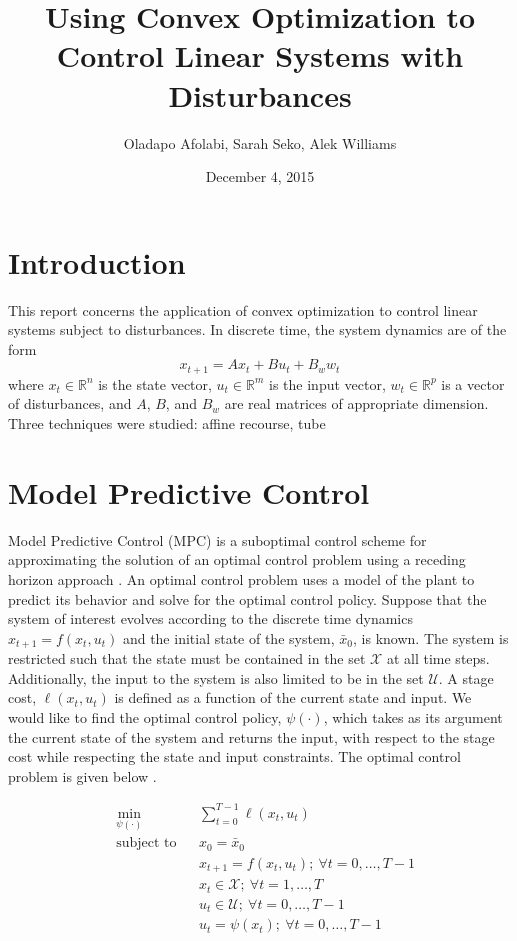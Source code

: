 \documentclass[12 pt]{report}
\title{Using Convex Optimization to Control Linear Systems with Disturbances}
\author{Oladapo Afolabi, Sarah Seko, Alek Williams}
\date{December 4, 2015}
\begin{document}
\maketitle

\begin{abstract}
\end{abstract}

\section{Introduction}
This report concerns the application of convex optimization to control linear systems subject to disturbances. In discrete time, the system dynamics are of the form $$ x_{t+1} = Ax_t + Bu_t + B_w w_t $$ where $x_t \in \mathbb{R}^n$ is the state vector, $u_t \in \mathbb{R}^m$ is the input vector, $w_t \in \mathbb{R}^p$ is a vector of disturbances, and $A$, $B$, and $B_w$ are real matrices of appropriate dimension. Three techniques were studied: affine recourse, tube 

\section{Model Predictive Control}

Model Predictive Control (MPC) is a suboptimal control scheme for approximating the solution of an optimal control problem using a receding horizon approach \cite{MPCbook}. An optimal control problem uses a model of the plant to predict its behavior and solve for the optimal control policy. Suppose that the system of interest evolves according to the discrete time dynamics $x_{t+1} = f(x_t, u_t)$ and the initial state of the system, $\bar{x}_0$, is known. The system is restricted such that the state must be contained in the set $\mathcal{X}$ at all time steps. Additionally, the input to the system is also limited to be in the set $\mathcal{U}$. A stage cost, $\ell (x_t, u_t)$ is defined as a function of the current state and input. We would like to find the optimal control policy, $\psi(\cdot)$, which takes as its argument the current state of the system and returns the input, with respect to the stage cost while respecting the state and input constraints. The optimal control problem is given below \cite{schildbach14}.

\begin{equation*}
\begin{aligned}
& \min_{\psi(\cdot)} & & \sum_{t = 0}^{T-1} \ell (x_t, u_t) \\
& \text{subject to} & & x_0 = \bar{x}_0 \\
& & & x_{t+1} = f(x_t, u_t); ~ \forall t = 0, \dots, T-1 \\
& & & x_t \in \mathcal{X}; ~ \forall t = 1, \dots, T \\
& & & u_t \in \mathcal{U}; ~ \forall t = 0, \dots, T-1 \\
& & & u_t = \psi (x_t); ~ \forall t = 0, \dots, T-1
\end{aligned}
\end{equation*}
\end{document}
